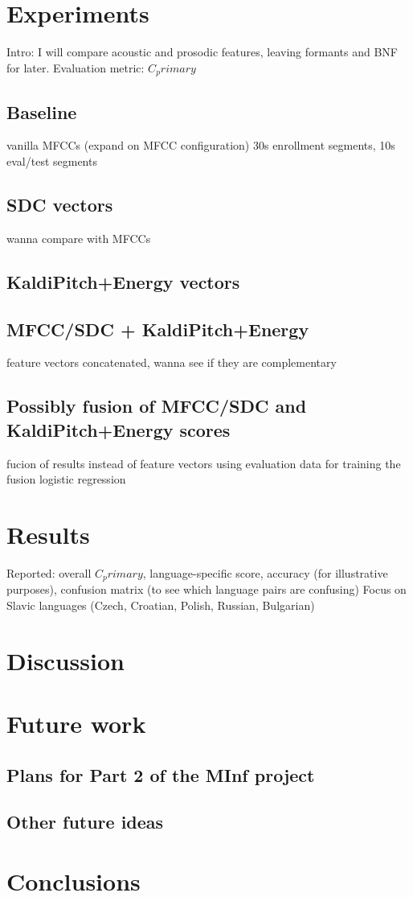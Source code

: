 \documentclass[bsc,frontabs,twoside,singlespacing,parskip,deptreport]{infthesis}
\begin{document}
\chapter{Experiments}{
  Intro: I will compare acoustic and prosodic features, leaving formants and BNF for later.
  Evaluation metric: $C_primary$

  \section{Baseline}{
    vanilla MFCCs (expand on MFCC configuration)
    30s enrollment segments, 10s eval/test segments
  }
  \section{SDC vectors}{
    wanna compare with MFCCs
  }
  \section{KaldiPitch+Energy vectors}{

  }
  \section{MFCC/SDC + KaldiPitch+Energy}{
    feature vectors concatenated, wanna see if they are complementary
  }
  \section{Possibly fusion of MFCC/SDC and KaldiPitch+Energy scores}{
    fucion of results instead of feature vectors
    using evaluation data for training the fusion logistic regression
  }
}

\chapter{Results}{
  Reported: overall $C_primary$, language-specific score, accuracy (for illustrative purposes), confusion matrix (to see which language pairs are confusing)
  Focus on Slavic languages (Czech, Croatian, Polish, Russian, Bulgarian)
}

\chapter{Discussion}{
  
}

\chapter{Future work}{
  \section{Plans for Part 2 of the MInf project}{

  }
  \section{Other future ideas}{

  }
}

\chapter{Conclusions}{
  
}



\end{document}
